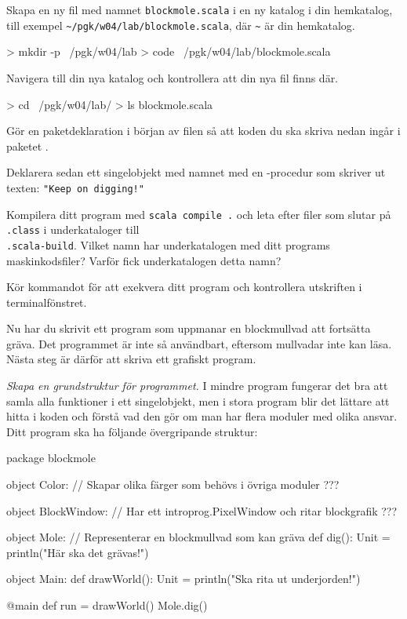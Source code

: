 \Subtask
Skapa en ny fil med namnet \texttt{blockmole.scala} i en ny katalog i din hemkatalog, till exempel \texttt{\textasciitilde/pgk/w04/lab/blockmole.scala}, där \texttt{\textasciitilde} är din hemkatalog.
\begin{REPLnonum}
> mkdir -p ~/pgk/w04/lab
> code ~/pgk/w04/lab/blockmole.scala
\end{REPLnonum}


\Subtask
Navigera till din nya katalog och kontrollera att din nya fil finns där.
\begin{REPLnonum}
> cd ~/pgk/w04/lab/
> ls
blockmole.scala
\end{REPLnonum}

\Subtask
Gör en paketdeklaration i början av filen  så att koden du ska skriva nedan ingår i paketet .

\Subtask
Deklarera sedan ett singelobjekt med namnet  med en -procedur som skriver ut texten: \texttt{"Keep on digging!"}

\Subtask
Kompilera ditt program med \texttt{scala compile .} och leta efter filer som slutar på \texttt{.class} i underkataloger till\\\texttt{.scala-build}. \Pen Vilket namn har underkatalogen med ditt programs maskinkodsfiler? Varför fick underkatalogen detta namn?

\Subtask
Kör kommandot  för att exekvera ditt program och kontrollera utskriften i terminalfönstret.

\vspace{1em}\noindent Nu har du skrivit ett program som uppmanar en blockmullvad att fortsätta gräva. Det programmet är inte så användbart, eftersom mullvadar inte kan läsa. Nästa steg är därför att skriva ett grafiskt program.%



\Task \emph{Skapa en grundstruktur för programmet.}
I mindre program fungerar det bra att samla alla funktioner i ett singelobjekt, men i stora program blir det lättare att hitta i koden och förstå vad den gör om man har flera moduler med olika ansvar. Ditt program ska ha följande övergripande struktur:

\begin{Code}
package blockmole

object Color:
  // Skapar olika färger som behövs i övriga moduler
  ???

object BlockWindow:
  // Har ett introprog.PixelWindow och ritar blockgrafik
  ???

object Mole: // Representerar en blockmullvad som kan gräva
  def dig(): Unit = println("Här ska det grävas!")

object Main:
  def drawWorld(): Unit = println("Ska rita ut underjorden!")

  @main def run = 
    drawWorld()
    Mole.dig()
\end{Code}

